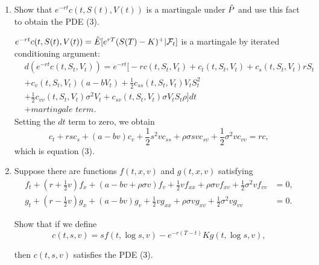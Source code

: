 \documentclass[handout,8pt]{beamer}
\begin{document}
\begin{frame}[allowframebreaks]{ }
\begin{enumerate}
    \begin{enumerate}
        \item Show that $e^{-rt}c(t,S(t),V(t))$ is a martingale under $\Tilde{P}$ and use this fact to obtain the PDE (3).\newline
        
        $e^{-rt}c(t,S(t),V(t)) = \Tilde{E}[e^{rT}(S(T)-K)^+|\mathcal{F}_t]$ is a martingale by iterated conditioning argument: \newline
        \begin{align*}
            & d(e^{-rt}c(t,S_t,V_t)) = e^{-rt}\bigg[-rc(t,S_t,V_t) + c_t(t,S_t,V_t) + c_s(t,S_t,V_t)rS_t \\
            & + c_v(t,S_t,V_t)(a-bV_t) + \frac{1}{2}c_{ss}(t,S_t,V_t)V_tS_t^2 \\
            &+ \frac{1}{2}c_{vv}(t,S_t,V_t)\sigma^2V_t + c_{sv}(t,S_t,V_t)\sigma V_tS_t\rho\bigg] dt\\
            &+\textit{martingale term.}
        \end{align*}
        Setting the $dt$ term to zero, we obtain
        \begin{equation*}
            c_t + rsc_s + (a-bv)c_v + \frac{1}{2}s^2vc_{ss} + \rho\sigma svc_{sv} + \frac{1}{2}\sigma^2vc_{vv} = rc,
        \end{equation*}
        which is equation (3).
    
    	\vspace*{1.5cm}
	
        \item  Suppose there are functions $f(t,x,v)$ and $g(t,x,v)$ satisfying
        \begin{align}
            f_t + \left(r + \frac{1}{2}v\right) f_x + (a - bv + \rho \sigma v) f_v + \frac{1}{2}vf_{xx} + \rho\sigma v f_{xv} + \frac{1}{2}\sigma^2 v f_{vv} &= 0,\\
            g_t + \left(r - \frac{1}{2}v\right) g_x + (a - bv) g_v + \frac{1}{2}vg_{xx} + \rho \sigma v g_{xv} + \frac{1}{2}\sigma^2 vg_{vv} &=0.
        \end{align}
        
        Show that if we define
        \begin{equation}
            c(t,s,v) = sf(t,\log s, v) - e^{-r(T-t)}Kg(t,\log s, v),
        \end{equation}
        
        then $c(t,s,v)$ satisfies the PDE (3).\newline
        

\end{enumerate}
\end{enumerate}
\end{frame}
\end{document}
